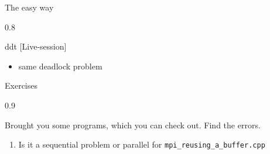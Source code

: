 \documentclass[aspectratio=1610]{beamer}
\newenvironment{centeredblock}[2][0.8\textwidth]
{ %
	\begin{center}
		\begin{varwidth}{#1} %
			\begin{block}{#2}
				\centering
			}
			{ %
			\end{block}
		\end{varwidth}
	\end{center}
}
\begin{document}
	\begin{frame}[fragile]{The easy way}
		\begin{centeredblock}{ddt [Live-session]}
			\begin{itemize}
				\item same deadlock problem	
			\end{itemize}
		\end{centeredblock}
	\end{frame}
	
	
	\begin{frame}[fragile]{Exercises}
		\begin{centeredblock}[0.9 \textwidth]{}
			Brought you some programs, which you can check out. Find the errors.
			\begin{enumerate}

				\item Is it a sequential problem or parallel for \texttt{mpi\_reusing\_a\_buffer.cpp}
			\end{enumerate}
		\end{centeredblock}
	\end{frame}
\end{document}
